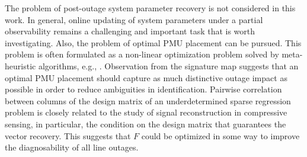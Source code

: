 The problem of post-outage system parameter recovery is not considered in this work. In general, online updating of system parameters under a partial observability remains a challenging and important task that is worth investigating. Also, the problem of optimal PMU placement can be pursued.  This problem is often formulated as a non-linear optimization problem solved by meta-heuristic algorithms, e.g., \cite{yang2020optimal}. Observation from the signature map suggests that an optimal PMU placement should capture as much distinctive outage impact as possible in order to reduce ambiguities in identification. Pairwise correlation between columns of the design matrix of an underdetermined sparse regression problem is closely related to the study of signal reconstruction in compressive sensing, in particular, the condition on the design matrix that guarantees the vector recovery. This suggests that $F$ could be optimized in some way to improve the diagnosability of all line outages.